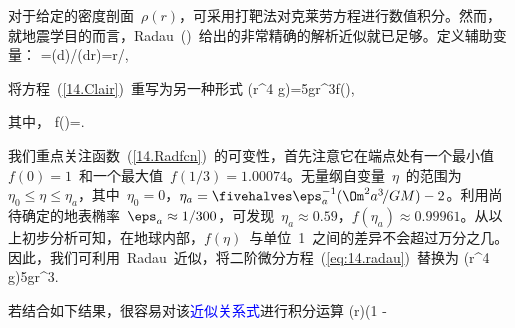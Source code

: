 对于给定的密度剖面~$\rho(r)$，可采用打靶法对克莱劳方程进行数值积分。然而，就地震学目的而言，Radau~(\citeyear{radau85})~给出的非常精确的解析近似就已足够。定义辅助变量：
\eq
\eta=(d\ln\eps)/(d\ln r)=r\dot{\eps}/\eps,
\en

将方程~(\ref{14.Clair})~重写为另一种形式
\eq
{}\left(r^4 g\right)=5gr^3f(\eta),
\label{eq:14.radau}
\en

其中，
\eq \label{14.Radfcn}
f(\eta)=.
\en

我们重点关注函数~(\ref{14.Radfcn})~的可变性，首先注意它在端点处有一个最小值~$f(0)=1$~和一个最大值~$f(1/3)=1.00074$。无量纲自变量~$\eta$~的范围为~$\eta_0\leq\eta\leq\eta_a$，其中~$\eta_0=0$，$\eta_a=\fivehalves\eps_a^{-1}(\Om^2a^3\hspace{-0.5 mm}/GM)-2$。利用尚待确定的地表椭率~$\eps_a\approx 1/300$，可发现~$\eta_a\approx 0.59$，$f(\eta_a)\approx 0.99961$。从以上初步分析可知，在地球内部，$f(\eta)$~与单位~1~之间的差异不会超过万分之几。因此，我们可利用~Radau~近似，将二阶微分方程~(\ref{eq:14.radau})~替换为
\eq
{}\left(r^4 g\right)\approx5gr^3.
\en

若结合如下结果，很容易对该\textcolor{blue}{近似关系式}进行积分运算
\eq \label{14.eta}
\eta(r)\approx\twentyfivefourths\left(1
-
{}
